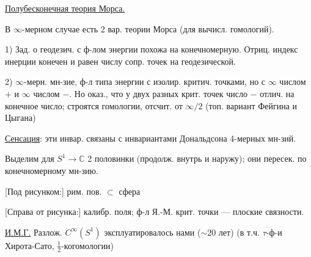 \underline{Полубесконечная теория Морса.}

В $\infty$-мерном случае есть 2 вар. теории Морса (для вычисл. гомологий).

1) Зад. о геодезич. с ф-лом энергии похожа на конечномерную.
Отриц. индекс инерции конечен и равен числу сопр. точек на геодезической.

2) $\infty$-мерн. мн-зие, ф-л типа энергии
с изолир. критич. точками, но с $\infty$ числом $+$ и $\infty$ числом $-$.
Но оказ., что у двух разных крит. точек число $-$ отлич. на конечное
число; строятся гомологии, отсчит. от $\infty/2$
(топ. вариант Фейгина и Цыгана)

\underline{Сенсация}: эти инвар. связаны с инвариантами Дональдсона
4-мерных мн-зий.

\begin{center}
\end{center}

Выделим для $S^1\to\mathbb C$ 2 половинки (продолж. внутрь и наружу);
они пересек. по конечномерному мн-зию.



[Под рисунком:] рим. пов. $\subset$ сфера

[Справа от рисунка:] калибр. поля; ф-л Я.-М.
крит. точки — плоские связности.

\underline{И.М.Г.} Разлож. $C^\infty(S^1)$ эксплуатировалось нами ($\sim20$ лет)
(в т.ч. $\tau$-ф-и Хирота-Сато, $\frac12$-когомологии)

